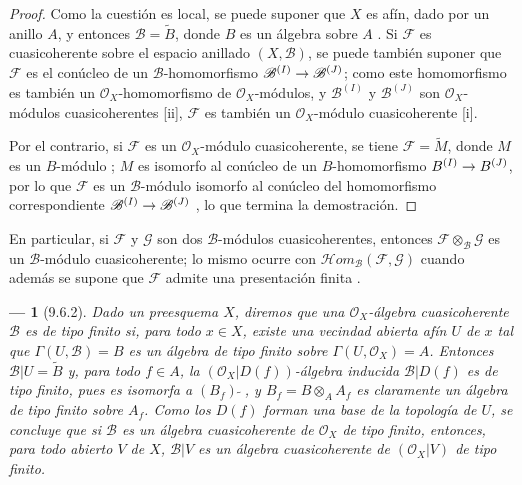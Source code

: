 \documentclass[oneside]{amsart}
\theoremstyle{ega-env-style}
\newtheorem*{env}{---}
\theoremstyle{ega-thm-env-style}
\theoremstyle{ega-defn-env-style}
\def\supertilde{{\,\widetilde{\,}\,}}   %
\renewcommand{\to}{\mathchoice{\longrightarrow}{\rightarrow}{\rightarrow}{\rightarrow}}
\let\EGAOriginalLabel\label
\renewcommand{\label}[1]{\phantomsection\EGAOriginalLabel{#1}}
\begin{document}
\begin{proof}
Como la cuestión es local, se puede suponer que $X$ es afín, dado por un anillo $A$, y entonces $\mathscr{B}=\widetilde{B}$, donde $B$ es un álgebra sobre $A$ .
Si $\mathscr{F}$ es cuasicoherente sobre el espacio anillado $(X,\mathscr{B})$, se puede también suponer que $\mathscr{F}$ es el conúcleo de un $\mathscr{B}$-homomorfismo $\mathscr{B}^{(I)}\to\mathscr{B}^{(J)}$; como este homomorfismo es también un $\mathscr{O}_X$-homomorfismo de $\mathscr{O}_X$-módulos, y $\mathscr{B}^{(I)}$ y $\mathscr{B}^{(J)}$ son $\mathscr{O}_X$-módulos cuasicoherentes [ii], $\mathscr{F}$ es también un $\mathscr{O}_X$-módulo cuasicoherente [i].

Por el contrario, si $\mathscr{F}$ es un $\mathscr{O}_X$-módulo cuasicoherente, se tiene $\mathscr{F}=\widetilde{M}$, donde $M$ es un $B$-módulo ; $M$ es isomorfo al conúcleo de un $B$-homomorfismo $B^{(I)}\to B^{(J)}$, por lo que $\mathscr{F}$ es un $\mathscr{B}$-módulo isomorfo al conúcleo del homomorfismo correspondiente $\mathscr{B}^{(I)}\to\mathscr{B}^{(J)}$ , lo que termina la demostración.
\end{proof}

En particular, si $\mathscr{F}$ y $\mathscr{G}$ son dos $\mathscr{B}$-módulos cuasicoherentes, entonces $\mathscr{F}\otimes_{\mathscr{B}}\mathscr{G}$ es un $\mathscr{B}$-módulo cuasicoherente; lo mismo ocurre con $\mathscr{H}\!om_{\mathscr{B}}(\mathscr{F},\mathscr{G})$ cuando además se supone que $\mathscr{F}$ admite una presentación finita .

\begin{env}[9.6.2]
\label{I.9.6.2}
Dado un preesquema $X$, diremos que una $\mathscr{O}_X$-álgebra cuasicoherente $\mathscr{B}$ es \emph{de tipo finito} si, para todo $x\in X$, existe una vecindad abierta \emph{afín} $U$ de $x$ tal que $\Gamma(U,\mathscr{B})=B$ es un álgebra de tipo finito sobre $\Gamma(U,\mathscr{O}_X)=A$.
Entonces $\mathscr{B}|U=\widetilde{B}$ y, para todo $f\in A$, la $(\mathscr{O}_X|D(f))$-álgebra inducida $\mathscr{B}|D(f)$ es de tipo finito, pues es isomorfa a $(B_f)\supertilde$, y $B_f=B\otimes_A A_f$ es claramente un álgebra de tipo finito sobre $A_f$.
Como los $D(f)$ forman una base de la topología de $U$, se concluye que si $\mathscr{B}$ es un álgebra cuasicoherente de $\mathscr{O}_X$ de tipo finito, entonces, para todo abierto $V$ de $X$, $\mathscr{B}|V$ es un álgebra cuasicoherente de $(\mathscr{O}_X|V)$ de tipo finito.
\end{env}
\end{document}
